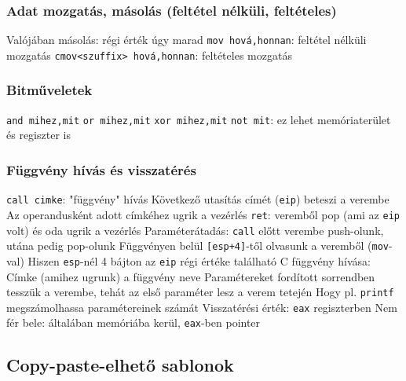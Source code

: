 \documentclass[12pt,a4paper]{article}
\begin{document}
\subsubsection{Adat mozgatás, másolás (feltétel nélküli, feltételes)}

\begin{outline}
	\1 Valójában másolás: régi érték úgy marad
	\1 \texttt{mov hová,honnan}: feltétel nélküli mozgatás
	\1 \texttt{cmov<szuffix> hová,honnan}: feltételes mozgatás
\end{outline}

\pagebreak

\subsubsection{Bitműveletek}

\begin{outline}
	\1 \texttt{and mihez,mit}
	\1 \texttt{or mihez,mit}
	\1 \texttt{xor mihez,mit}
	\1 \texttt{not mit}: ez lehet memóriaterület és regiszter is
\end{outline}

\subsubsection{Függvény hívás és visszatérés}

\begin{outline}
	\1 \texttt{call cimke}: "függvény" hívás
		\2 Következő utasítás címét (\texttt{eip}) beteszi a verembe
		\2 Az operandusként adott címkéhez ugrik a vezérlés
	\1 \texttt{ret}: veremből pop (ami az \texttt{eip} volt) és oda ugrik a vezérlés
	\1 Paraméterátadás:
		\2 \texttt{call} előtt verembe push-olunk, utána pedig pop-olunk
		\2 Függvényen belül \texttt{[esp+4]}-től olvasunk a veremből (\texttt{mov}-val)
			\3 Hiszen \texttt{esp}-nél 4 bájton az \texttt{eip} régi értéke található
	\1 C függvény hívása:
		\2 Címke (amihez ugrunk) a függvény neve
		\2 Paramétereket fordított sorrendben tesszük a verembe, tehát az első paraméter lesz a verem tetején
			\3 Hogy pl. \texttt{printf} megszámolhassa paramétereinek számát
		\2 Visszatérési érték: \texttt{eax} regiszterben
			\3 Nem fér bele: általában memóriába kerül, \texttt{eax}-ben pointer
\end{outline}

\pagebreak

\subsection{Copy-paste-elhető sablonok}
\end{document}
